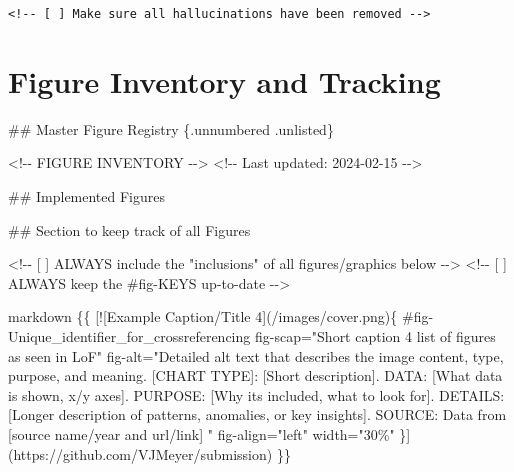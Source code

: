 \documentclass[
  11pt,
  letterpaper,
]{book}
\newenvironment{Shaded}{\begin{snugshade}}{\end{snugshade}}
\newcommand{\CommentTok}[1]{\textcolor[rgb]{0.37,0.37,0.37}{#1}}
\newcommand{\FunctionTok}[1]{\textcolor[rgb]{0.28,0.35,0.67}{#1}}
\newcommand{\InformationTok}[1]{\textcolor[rgb]{0.37,0.37,0.37}{#1}}
\newcommand{\NormalTok}[1]{\textcolor[rgb]{0.00,0.23,0.31}{#1}}
\newcommand{\OtherTok}[1]{\textcolor[rgb]{0.00,0.23,0.31}{#1}}
\begin{document}
\texttt{\textless{}!-\/-\ {[}\ {]}\ Make\ sure\ all\ hallucinations\ have\ been\ removed\ -\/-\textgreater{}}

\section{Figure Inventory and
Tracking}\label{figure-inventory-and-tracking}

\begin{Shaded}
\begin{Highlighting}[]
\FunctionTok{\#\# Master Figure Registry \{.unnumbered .unlisted\}}

\CommentTok{\textless{}!{-}{-} FIGURE INVENTORY {-}{-}\textgreater{}}
\CommentTok{\textless{}!{-}{-} Last updated: 2024{-}02{-}15 {-}{-}\textgreater{}}

\FunctionTok{\#\# Implemented Figures}


\FunctionTok{\#\# Section to keep track of all Figures}

\InformationTok{\textasciigrave{}\textless{}!{-}{-} [ ] ALWAYS include the "inclusions" of all figures/graphics below {-}{-}\textgreater{}\textasciigrave{}}
\InformationTok{\textasciigrave{}\textless{}!{-}{-} [ ] ALWAYS keep the \#fig{-}KEYS up{-}to{-}date {-}{-}\textgreater{}\textasciigrave{}}

\InformationTok{\textasciigrave{}\textasciigrave{}\textasciigrave{}markdown}
\NormalTok{\{\{}
\CommentTok{[}\OtherTok{![Example Caption/Title 4}\CommentTok{](/images/cover.png)}\NormalTok{\{}
\NormalTok{    \#fig{-}Unique\_identifier\_for\_crossreferencing}
\NormalTok{    fig{-}scap="Short caption 4 list of figures as seen in LoF"}
\NormalTok{    fig{-}alt="Detailed alt text that describes the image content, type, purpose, and meaning.}
            \OtherTok{[CHART TYPE]: }\CommentTok{[}\OtherTok{Short description}\CommentTok{]}\NormalTok{.}
\NormalTok{                DATA: }\CommentTok{[}\OtherTok{What data is shown, x/y axes}\CommentTok{]}\NormalTok{.}
\NormalTok{                PURPOSE: }\CommentTok{[}\OtherTok{Why it\textquotesingle{}s included, what to look for}\CommentTok{]}\NormalTok{.}
\NormalTok{                DETAILS: }\CommentTok{[}\OtherTok{Longer description of patterns, anomalies, or key insights}\CommentTok{]}\NormalTok{.}
\NormalTok{                SOURCE: Data from }\CommentTok{[}\OtherTok{source name/year and url/link}\CommentTok{]}
\NormalTok{            "}
\NormalTok{    fig{-}align="left"}
\NormalTok{    width="30\%"}
\NormalTok{    \}](https://github.com/VJMeyer/submission)}
\NormalTok{\}\}}
\end{Highlighting}
\end{Shaded}
\end{document}
